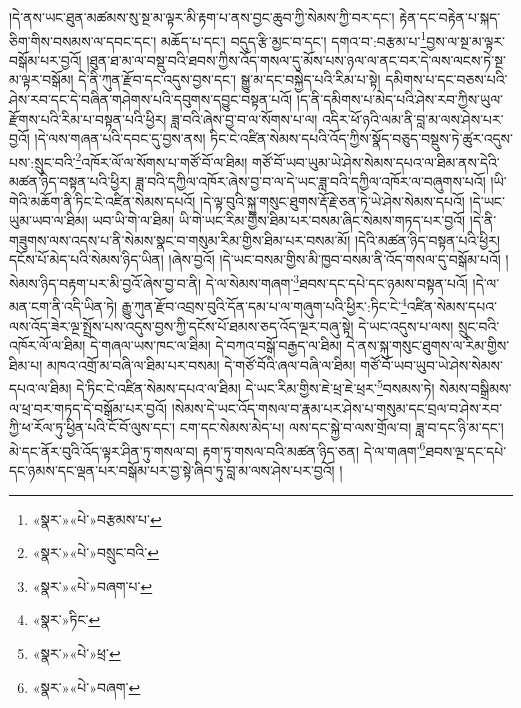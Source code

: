 །དེ་ནས་ཡང་ཐུན་མཚམས་སུ་སྔ་མ་ལྟར་མི་རྟག་པ་ནས་བྱང་ཆུབ་ཀྱི་སེམས་ཀྱི་བར་དང་། རྟེན་དང་བརྟེན་པ་སྐད་ཅིག་གིས་བསམས་ལ་དབང་དང་། མཆོད་པ་དང་། བདུད་རྩི་མྱང་བ་དང་། དགའ་བ་:བརྩམ་པ་\footnote{«སྣར་»«པེ་»བརྩམས་པ་}བྱས་ལ་སྔ་མ་ལྟར་བསྒོམ་པར་བྱའོ། །ཐུན་ཐ་མ་ལ་བསྡུ་བའི་ཐབས་ཀྱིས་འོད་གསལ་དུ་མོས་པས་ཉལ་ལ་ནང་བར་དེ་ལས་ལངས་ཏེ་སྔ་མ་ལྟར་བསྒོམ། དེ་ནི་ཀུན་རྫོབ་དང་འདུས་བྱས་དང་། སྒྱུ་མ་དང་བསྐྱེད་པའི་རིམ་པ་སྟེ། དམིགས་པ་དང་བཅས་པའི་ཤེས་རབ་དང་དེ་བཞིན་གཤེགས་པའི་དབུགས་དབྱུང་བསྟན་པའོ། །ད་ནི་དམིགས་པ་མེད་པའི་ཤེས་རབ་ཀྱིས་ཡུལ་རྫོགས་པའི་རིམ་པ་བསྟན་པའི་ཕྱིར། ཟླ་བའི་ཞེས་བྱ་བ་ལ་སོགས་པ་ལ། འདིར་ཕོ་ཉའི་ལམ་ནི་བླ་མ་ལས་ཤེས་པར་བྱའོ། །དེ་ལས་གཞན་པའི་དབང་དུ་བྱས་ནས། ཏིང་ངེ་འཛིན་སེམས་དཔའི་འོད་ཀྱིས་སྣོད་བཅུད་བསྡུས་ཏེ་ཚུར་འདུས་པས་:སྲུང་བའི་\footnote{«སྣར་»«པེ་»བསྲུང་བའི་}འཁོར་ལོ་ལ་སོགས་པ་གཙོ་བོ་ལ་ཐིམ། གཙོ་བོ་ཡབ་ཡུམ་ཡེ་ཤེས་སེམས་དཔའ་ལ་ཐིམ་ནས་དེའི་མཚན་ཉིད་བསྟན་པའི་ཕྱིར། ཟླ་བའི་དཀྱིལ་འཁོར་ཞེས་བྱ་བ་ལ་དེ་ཡང་ཟླ་བའི་དཀྱིལ་འཁོར་ལ་བཞུགས་པའོ། །ཡི་གེའི་མཆོག་ནི་ཏིང་ངེ་འཛིན་སེམས་དཔའོ། །དེ་ལྟ་བུའི་སྐུ་གསུང་ཐུགས་རྡོ་རྗེ་ཅན་ཏེ་ཡེ་ཤེས་སེམས་དཔའོ། །དེ་ཡང་ཡུམ་ཡབ་ལ་ཐིམ། ཡབ་ཡི་གེ་ལ་ཐིམ། ཡི་གེ་ཡང་རིམ་གྱིས་ཐིམ་པར་བསམ་ཞིང་སེམས་གཏད་པར་བྱའོ། །དེ་ནི་གཟུགས་ལས་འདས་པ་ནི་སེམས་སྣང་བ་གསུམ་རིམ་གྱིས་ཐིམ་པར་བསམ་མོ། །དེའི་མཚན་ཉིད་བསྟན་པའི་ཕྱིར། དངོས་པོ་མེད་པའི་སེམས་ཉིད་ཡིན། །ཞེས་བྱའོ། །དེ་ཡང་བསམ་གྱིས་མི་ཁྱབ་བསམ་ནི་འོད་གསལ་དུ་བསྒོམ་པའོ། །སེམས་ཉིད་བརྟག་པར་མི་བྱའོ་ཞེས་བྱ་བ་ནི། དེ་ལ་སེམས་གཞག་\footnote{«སྣར་»«པེ་»བཞག་པ་}ཐབས་དང་དཔེ་དང་ཉམས་བསྟན་པའོ། །དེ་ལ་མན་ངག་ནི་འདི་ཡིན་ཏེ། རྒྱུ་ཀུན་རྫོབ་འབྲས་བུའི་དོན་དམ་པ་ལ་གཞུག་པའི་ཕྱིར་:ཏིང་ངེ་\footnote{«སྣར་»ཏིང་}འཛིན་སེམས་དཔའ་ལས་འོད་ཟེར་ལྔ་སྤྲོས་པས་འདུས་བྱས་ཀྱི་དངོས་པོ་ཐམས་ཅད་འོད་ལྔར་བཞུ་སྟེ། དེ་ཡང་འདུས་པ་ལས། སྲུང་བའི་འཁོར་ལོ་ལ་ཐིམ། དེ་གཞལ་ཡས་ཁང་ལ་ཐིམ། དེ་བཀའ་བསྒོ་བརྒྱད་ལ་ཐིམ། དེ་ནས་སྐུ་གསུང་ཐུགས་ལ་རིམ་གྱིས་ཐིམ་པ། མཁའ་འགྲོ་མ་བཞི་ལ་ཐིམ་པར་བསམ། དེ་གཙོ་བོའི་ཞལ་བཞི་ལ་ཐིམ། གཙོ་བོ་ཡབ་ཡུབ་ཡེ་ཤེས་སེམས་དཔའ་ལ་ཐིམ། དེ་ཏིང་ངེ་འཛིན་སེམས་དཔའ་ལ་ཐིམ། དེ་ཡང་རིམ་གྱིས་ཇེ་ཕྲ་ཇེ་ཕྲར་\footnote{«སྣར་»«པེ་»ཕྲ་}བསམས་ཏེ། སེམས་བསྒྲིམས་ལ་ཕྲ་བར་གཏད་དེ་བསྒོམ་པར་བྱའོ། །སེམས་དེ་ཡང་འོད་གསལ་བ་རྣམ་པར་ཤེས་པ་གསུམ་དང་བྲལ་བ་ཤེས་རབ་ཀྱི་ཕ་རོལ་ཏུ་ཕྱིན་པའི་ངོ་བོ་ལུས་དང་། ངག་དང་སེམས་མེད་པ། ལས་དང་སྐྱེ་བ་ལས་གྲོལ་བ། ཟླ་བ་དང་ཉི་མ་དང་། མེ་དང་ནོར་བུའི་འོད་ལྟར་ཤིན་ཏུ་གསལ་བ། རྟག་ཏུ་གསལ་བའི་མཚན་ཉིད་ཅན། དེ་ལ་གཞག་\footnote{«སྣར་»«པེ་»བཞག་}ཐབས་ལྔ་དང་དཔེ་དང་ཉམས་དང་ལྡན་པར་བསྒོམ་པར་བྱ་སྟེ་ཞིབ་ཏུ་བླ་མ་ལས་ཤེས་པར་བྱའོ། །
